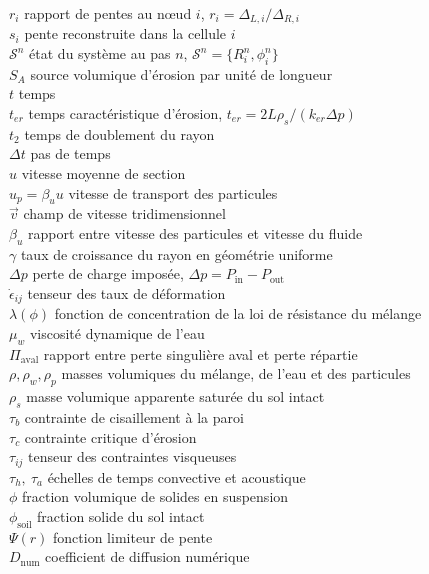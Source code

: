 \documentclass[11pt,a4paper]{report}
\newcommand{\phisol}{\phi_{\mathrm{soil}}}
\newcommand{\ter}{{t_{er}}}
\newcommand{\dt}{\Delta t}
\newcommand{\Disc}{D_{\mathrm{num}}}
\begin{document}
\begin{tabbing}
\(r_i\) \> rapport de pentes au nœud \(i\), \(r_i = \Delta_{L,i}/\Delta_{R,i}\) \\
\(s_i\) \> pente reconstruite dans la cellule \(i\) \\
\(\mathcal{S}^n\) \> état du système au pas \(n\), \(\mathcal{S}^n=\{R_i^n,\phi_i^n\}\) \\
\(S_A\) \> source volumique d'érosion par unité de longueur \\
\(t\) \> temps \\
\(\ter\) \> temps caractéristique d'érosion, \(\ter = 2L\rho_s/(k_{er}\Delta p)\) \\
\(t_2\) \> temps de doublement du rayon \\
\(\dt\) \> pas de temps \\
\(u\) \> vitesse moyenne de section \\
\(u_p = \beta_u u\) \> vitesse de transport des particules \\
\(\vec{v}\) \> champ de vitesse tridimensionnel \\
\(\beta_u\) \> rapport entre vitesse des particules et vitesse du fluide \\
\(\gamma\) \> taux de croissance du rayon en géométrie uniforme \\
\(\Delta p\) \> perte de charge imposée, \(\Delta p = P_{\mathrm{in}}-P_{\mathrm{out}}\) \\
\(\dot{\epsilon}_{ij}\) \> tenseur des taux de déformation \\
\(\lambda(\phi)\) \> fonction de concentration de la loi de résistance du mélange \\
\(\mu_w\) \> viscosité dynamique de l'eau \\
\(\Pi_{\mathrm{aval}}\) \> rapport entre perte singulière aval et perte répartie \\
\(\rho,\rho_w,\rho_p\) \> masses volumiques du mélange, de l'eau et des particules \\
\(\rho_s\) \> masse volumique apparente saturée du sol intact \\
\(\tau_b\) \> contrainte de cisaillement à la paroi \\
\(\tau_c\) \> contrainte critique d'érosion \\
\(\tau_{ij}\) \> tenseur des contraintes visqueuses \\
\(\tau_h,\ \tau_a\) \> échelles de temps convective et acoustique \\
\(\phi\) \> fraction volumique de solides en suspension \\
\(\phisol\) \> fraction solide du sol intact \\
\(\Psi(r)\) \> fonction limiteur de pente \\
\(\Disc\) \> coefficient de diffusion numérique \\
\end{tabbing}
\end{document}
